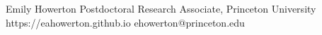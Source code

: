 \documentclass[10pt,letterpaper]{article}
\begin{document}
\cvheader
  {Emily Howerton}
  {Postdoctoral Research Associate, Princeton University}
  {https://eahowerton.github.io}
  {ehowerton@princeton.edu}







\end{document}
